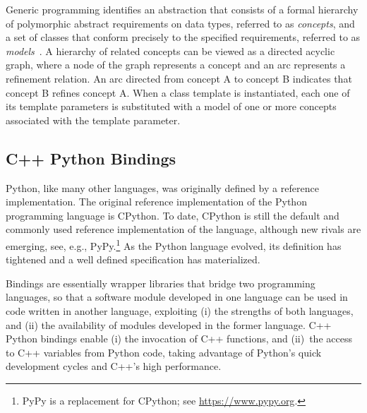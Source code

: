 Generic programming identifies an abstraction that consists of a
formal hierarchy of polymorphic abstract requirements on data types,
referred to as \emph{concepts}, and a set of classes that conform
precisely to the specified requirements, referred to as
\emph{models}~\cite{a-gps-99}. A hierarchy of related concepts can be
viewed as a directed acyclic graph, where a node of the graph
represents a concept and an arc represents a refinement relation. An
arc directed from concept A to concept B indicates that concept B
refines concept A. When a class template is instantiated, each one of
its template parameters is substituted with a model of one or more
concepts associated with the template parameter.

\subsection{C++ Python Bindings}
\label{ssec:intro:bind}
Python, like many other languages, was originally defined by a
reference implementation. The original reference implementation of the
Python programming language is CPython. To date, CPython is still the
default and commonly used reference implementation of the language,
although new rivals are emerging, see, e.g., PyPy.\footnote{PyPy is a
  replacement for CPython; see \url{https://www.pypy.org}.} As the
Python language evolved, its definition has tightened and a well
defined specification has materialized.

Bindings are essentially wrapper libraries that bridge two programming
languages, so that a software module developed in one language can be
used in code written in another language, exploiting (i) the strengths
of both languages, and (ii) the availability of modules developed in
the former language. C++ Python bindings enable (i) the invocation of
C++ functions, and (ii)~the access to C++ variables from Python code,
taking advantage of Python's quick development cycles and C++'s high
performance.

